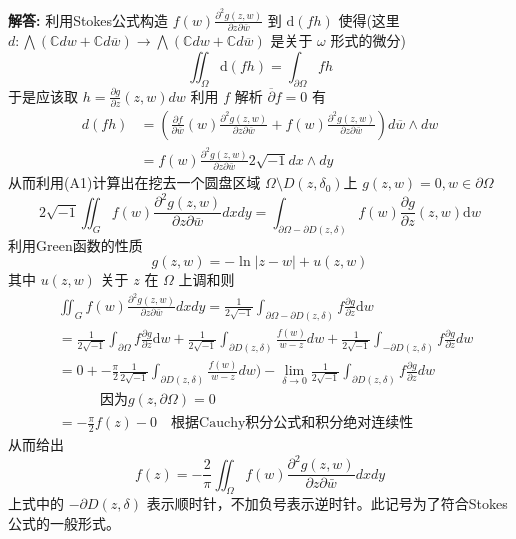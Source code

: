 \documentclass[12pt, a4paper, oneside]{ctexart}
\newcommand{\C}{\mathbb{C}}
\newenvironment{solution}{\par\noindent\textbf{解答:}}{\par}
\begin{document}
\begin{solution}
    利用Stokes公式构造
    $f(w)\frac{\partial^{2}g(z,w)}{\partial z\partial \bar{w}}$ 到 
    $\mathrm{d}(f h)$ 使得(这里 $d: \bigwedge (\C dw + \C  d\overline{w}) \to \bigwedge (\C dw + \C  d\overline{w})$ 是关于 $\omega$ 形式的微分)
    \begin{equation*}
        \iint_{\Omega}\mathrm{d}(fh)=\int_{\partial \Omega}f h  \tag*{(A1)}
    \end{equation*}
    于是应该取 $h=\frac{\partial g}{\partial z}(z,w) d w$ 利用 $f$ 解析 $\overline{\partial} f = 0$ 有
    \begin{align*}
        d(fh) &= (\frac{\partial f}{\partial \overline{w}}(w)\frac{\partial^{2}g(z,w)}{\partial z\partial \bar{w}} + 
        f(w)\frac{\partial^{2}g(z,w)}{\partial z\partial \bar{w}})d\overline{w} \wedge dw \\
        & = f(w)\frac{\partial^{2}g(z,w)}{\partial z\partial \bar{w}} 2\sqrt{-1} dx\wedge dy
    \end{align*}
    从而利用(A1)计算出在挖去一个圆盘区域 $\Omega\setminus D(z,\delta_{0})$上
        $g(z,w)=0,w\in\partial\Omega$
    \begin{equation*}
        2 \sqrt{-1} \iint_{G} f(w)\frac{\partial^{2}g(z,w)}{\partial z\partial \bar{w}} dx dy =
        \int_{\partial\Omega - \partial D(z,\delta)}f(w)\frac{\partial g }{\partial z}(z,w) \mathrm{d} w
    \end{equation*}
    利用Green函数的性质
    \begin{equation*}
        g(z,w) = - \ln |z-w| + u(z,w)
    \end{equation*}
    其中 $u(z,w)$ 关于 $z$ 在 $\Omega$ 上调和则 
    \begin{align*}
        &\iint_{G} f(w)\frac{\partial^{2}g(z,w)}{\partial z\partial \bar{w}} dx dy  
        = \frac{1}{2 \sqrt{-1}}\int_{\partial\Omega - \partial D(z,\delta)}f\frac{\partial g }{\partial z}\mathrm{d} w \\
        & = \frac{1}{2 \sqrt{-1}} \int_{\partial \Omega} f\frac{\partial g }{\partial z}\mathrm{d} w  + \frac{1}{2\sqrt{-1}}\int_{\partial D(z,\delta)}\frac{f(w)}{w-z} dw + \frac{1}{2\sqrt{-1}}\int_{-\partial D(z,\delta)}f\frac{\partial g }{\partial z} dw \\
        & = 0 + -\frac{\pi}{2} \frac{1}{2\sqrt{-1}}\int_{\partial D(z,\delta)}\frac{f(w)}{w-z} dw ) -  \lim_{\delta \to 0} \frac{1}{2\sqrt{-1}}\int_{\partial D(z,\delta)}f\frac{\partial g }{\partial z} dw \\
        &   \qquad \quad \text{因为} g(z,\partial \Omega) = 0\\
        & = -\frac{\pi}{2}f(z) - 0 \quad \text{根据Cauchy积分公式和积分绝对连续性} 
    \end{align*}
    从而给出 
    \begin{equation*}
        f(z) = -\frac{2}{\pi}\iint_{\Omega} f(w)\frac{\partial^{2}g(z,w)}{\partial z\partial \bar{w}}dxdy
    \end{equation*}
    上式中的 $-\partial D(z,\delta)$ 表示顺时针，不加负号表示逆时针。此记号为了符合Stokes公式的一般形式。
\end{solution}
    
\end{document}
